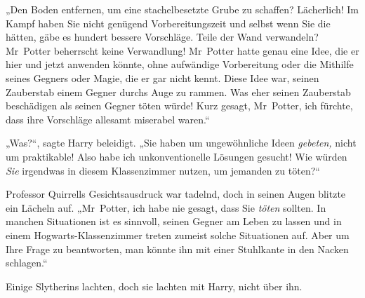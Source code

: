 „Den Boden entfernen, um eine stachelbesetzte Grube zu schaffen? Lächerlich! Im Kampf haben Sie nicht genügend Vorbereitungszeit und selbst wenn Sie die hätten, gäbe es hundert bessere Vorschläge. Teile der Wand verwandeln? Mr~Potter beherrscht keine Verwandlung! Mr~Potter hatte genau eine Idee, die er hier und jetzt anwenden könnte, ohne aufwändige Vorbereitung oder die Mithilfe seines Gegners oder Magie, die er gar nicht kennt. Diese Idee war, seinen Zauberstab einem Gegner durchs Auge zu rammen. Was eher seinen Zauberstab beschädigen als seinen Gegner töten würde! Kurz gesagt, Mr~Potter, ich fürchte, dass ihre Vorschläge allesamt miserabel waren.“

„Was?“, sagte Harry beleidigt. „Sie haben um ungewöhnliche Ideen \emph{gebeten,} nicht um praktikable! Also habe ich unkonventionelle Lösungen gesucht! Wie würden \emph{Sie} irgendwas in diesem Klassenzimmer nutzen, um jemanden zu töten?“

Professor Quirrells Gesichtsausdruck war tadelnd, doch in seinen Augen blitzte ein Lächeln auf. „Mr~Potter, ich habe nie gesagt, dass Sie \emph{töten} sollten. In manchen Situationen ist es sinnvoll, seinen Gegner am Leben zu lassen und in einem Hogwarts-Klassenzimmer treten zumeist solche Situationen auf. Aber um Ihre Frage zu beantworten, man könnte ihn mit einer Stuhlkante in den Nacken schlagen.“

Einige Slytherins lachten, doch sie lachten mit Harry, nicht über ihn.

